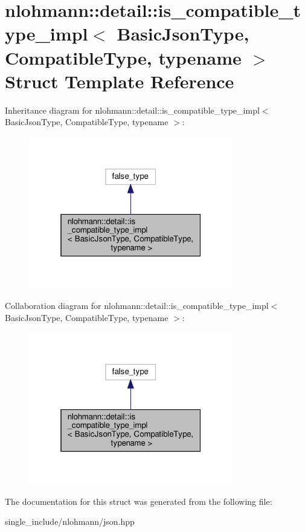 \hypertarget{structnlohmann_1_1detail_1_1is__compatible__type__impl}{}\section{nlohmann\+:\+:detail\+:\+:is\+\_\+compatible\+\_\+type\+\_\+impl$<$ Basic\+Json\+Type, Compatible\+Type, typename $>$ Struct Template Reference}
\label{structnlohmann_1_1detail_1_1is__compatible__type__impl}


Inheritance diagram for nlohmann\+:\+:detail\+:\+:is\+\_\+compatible\+\_\+type\+\_\+impl$<$ Basic\+Json\+Type, Compatible\+Type, typename $>$\+:\nopagebreak
\begin{figure}[H]
\begin{center}
\leavevmode
\includegraphics[width=253pt]{structnlohmann_1_1detail_1_1is__compatible__type__impl__inherit__graph}
\end{center}
\end{figure}


Collaboration diagram for nlohmann\+:\+:detail\+:\+:is\+\_\+compatible\+\_\+type\+\_\+impl$<$ Basic\+Json\+Type, Compatible\+Type, typename $>$\+:\nopagebreak
\begin{figure}[H]
\begin{center}
\leavevmode
\includegraphics[width=253pt]{structnlohmann_1_1detail_1_1is__compatible__type__impl__coll__graph}
\end{center}
\end{figure}


The documentation for this struct was generated from the following file\+:\begin{DoxyCompactItemize}
\item 
single\+\_\+include/nlohmann/json.\+hpp\end{DoxyCompactItemize}
